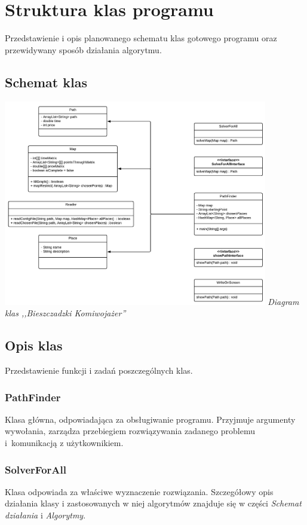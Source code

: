 \documentclass{article}
\begin{document}
\section{Struktura klas programu}
Przedstawienie i opis planowanego schematu klas gotowego programu oraz przewidywany sposób działania algorytmu.

\subsection{Schemat klas}

\begin{center}
    \includegraphics [height=9cm]{diagram_klas.pdf} \newline
    \textit{Diagram klas ,,Bieszczadzki Komiwojażer''}
\end{center}

\subsection{Opis klas}
Przedstawienie funkcji i zadań poszczególnych klas.

\subsubsection{PathFinder}
Klasa główna, odpowiadająca za obsługiwanie programu. Przyjmuje argumenty wywołania, zarządza przebiegiem rozwiązywania zadanego problemu i~komunikacją z użytkownikiem.

\subsubsection{SolverForAll}
Klasa odpowiada za właściwe wyznaczenie rozwiązania. Szczegółowy opis działania klasy i zastosowanych w niej algorytmów znajduje się w części \textit{Schemat działania} i \textit{Algorytmy}.
\end{document}
